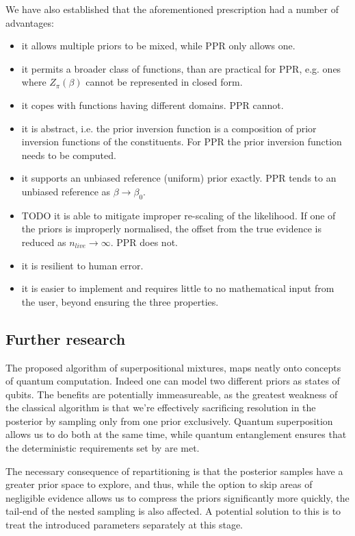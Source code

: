 \documentclass[usenatbib]{mnras}
\begin{document}
We have also established that the aforementioned prescription had a
number of advantages:
\begin{itemize}
\item it allows multiple priors to be mixed, while PPR only allows one.
\item it permits a broader class of functions, than are practical for
PPR, e.g. ones where \(Z_{\pi}(\beta)\) cannot be represented in
closed form.
\item it copes with functions having different domains. PPR cannot.
\item it is abstract, i.e. the prior inversion function is a composition
of prior inversion functions of the constituents. For PPR the
prior inversion function needs to be computed.
\item it supports an unbiased reference (uniform) prior exactly. PPR
tends to an unbiased reference as \(\beta\rightarrow\beta_{0}\).
\item TODO it is able to mitigate improper re-scaling of the
likelihood. If one of the priors is improperly normalised, the
offset from the true evidence is reduced as
\(n_{live}\rightarrow\infty\). PPR does not.
\item it is resilient to human error.
\item it is easier to implement and requires little to no mathematical
input from the user, beyond ensuring the three properties.
\end{itemize}


\subsection{Further research}
\label{sec:org14e7f98}
The proposed algorithm of superpositional mixtures, maps neatly
onto concepts of quantum computation. Indeed one can model two
different priors as states of qubits. The benefits are potentially
immeasureable, as the greatest weakness of the classical algorithm
is that we're effectively sacrificing resolution in the posterior
by sampling only from one prior exclusively. Quantum superposition
allows us to do both at the same time, while quantum entanglement
ensures that the deterministic requirements set by
\citeauthor{skilling2006} are met.

The necessary consequence of repartitioning is that the posterior
samples have a greater prior space to explore, and thus, while the
option to skip areas of negligible evidence allows us to compress
the priors significantly more quickly, the tail-end of the nested
sampling is also affected. A potential solution to this is to treat
the introduced parameters separately at this stage.
\end{document}
